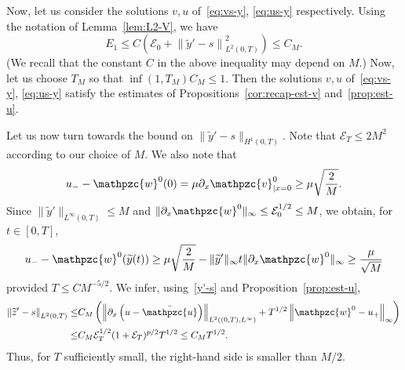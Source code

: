 \documentclass[AHL,Unicode,longabstracts,published]{cedram}
\newcommand{\p}{\partial}
\newcommand{\bu}{\bar{\mathpzc{u}}}
\newcommand{\cE}{\mathcal E}
\newcommand{\tv}{\mathpzc{v}}
\newcommand{\tw}{\mathpzc{w}}
\newcommand{\ty}{\widetilde{y}}
\newcommand{\tz}{\widetilde{z}}
\begin{document}
Now, let us consider the solutions $v,u$ of~\eqref{eq:vs-y}, \eqref{eq:us-y} respectively. Using the notation of Lemma~\ref{lem:L2-V}, we have
\[
E_1\leq C\left(\cE_0 + \left\|\ty'-s\right\|_{L^2(0,T)}^2\right)\leq C_M.
\]
(We recall that the constant $C$ in the above inequality may depend on $M$.) Now, let us choose $T_M$ so that $\inf(1,T_M) C_M\leq 1$. Then the solutions $v,u$ of~\eqref{eq:vs-y}, \eqref{eq:us-y} satisfy the estimates of Propositions~\ref{cor:recap-est-v} and~\ref{prop:est-u}.



Let us now turn towards the bound on $\|\ty'-s\|_{H^1(0,T)}$. Note that $\cE_T\leq 2M^2$ according to our choice of $M$. We also note that
\[
u_--\tw^0(0) = \mu \p_x \tv^0_{|x=0}
\geq \mu\sqrt{\frac{2}{M}}.
\]
Since $\|\ty'\|_{L^\infty(0,T)}\leq M$ and $\|\p_x \tw^0\|_\infty \leq \cE_0^{1/2} \leq M$, we obtain, for $t\in [0,T]$,
\begin{equation}\label{est-lower-bound-u_-w0}
u_--\tw^0(\ty(t))
\geq \mu \sqrt{\frac{2}{M}} - \|\ty'\|_\infty t \|\p_x\tw^0\|_\infty
\geq \frac{\mu}{\sqrt{M}}
\end{equation} provided $T\leq C M^{-5/2}$. We infer, using~\eqref{y'-s} and Proposition~\ref{prop:est-u},
\begin{align*}
\left\|\tz'-s\right\|_{L^2(0,T)}\leq &C_M \left(\left\|\p_x \left(u-\bu\right)\right\|_{L^2\left((0,T), L^\infty\right)} + T^{1/2} \left\|\tw^0- u_+\right\|_\infty\right)\\
\leq& C_M \cE_T^{1/2} (1 + \cE_T)^{p/2}T^{1/2}\leq C_M T^{1/2}.
\end{align*}
Thus, for $T$ sufficiently small, the right-hand side is smaller than $M/2$.
\end{document}
